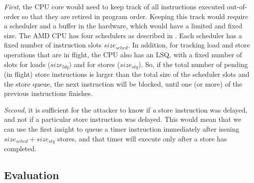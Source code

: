 \textit{First}, the CPU core would need to keep track of all instructions executed out-of-order so that they are retired in program order.
Keeping this track would require a scheduler and a buffer in the hardware, which would have a limited and fixed size.
The AMD CPU has four schedulers as described in . Each scheduler has a fixed number of instruction slots $size_{sched}$.
In addition, for tracking load and store operations that are in flight, the CPU also has an LSQ, with a fixed number of slots for loads ($size_{ldq}$) and for stores ($size_{stq}$).
So, if the total number of pending (in flight) store instructions is larger than the total size of the scheduler slots and the store queue, the next instruction will be blocked, until one (or more) of the previous instructions finishes.

\textit{Second}, it is sufficient for the attacker to know if \textit{a} store instruction was delayed, and not if a particular store instruction was delayed.
This would mean that we can use the first insight to queue a timer instruction immediately after issuing $size_{sched} + size_{stq}$ stores, and that timer will execute only after a store has completed.


\subsection{Evaluation}
\label{subsec:store-eval}

\endinput
